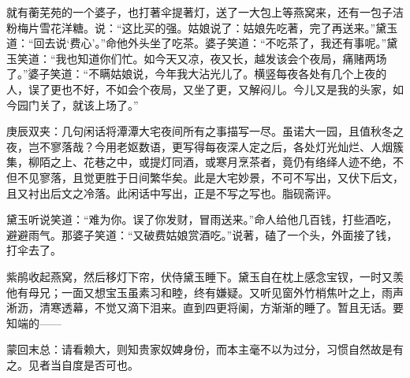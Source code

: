 \begin{parag}
    就有蘅芜苑的一个婆子，也打著伞提著灯，送了一大包上等燕窝来，还有一包子洁粉梅片雪花洋糖。说：“这比买的强。姑娘说了：姑娘先吃著，完了再送来。”黛玉道：“回去说‘费心’。”命他外头坐了吃茶。婆子笑道：“不吃茶了，我还有事呢。”黛玉笑道：“我也知道你们忙。如今天又凉，夜又长，越发该会个夜局，痛赌两场了。”婆子笑道：“不瞒姑娘说，今年我大沾光儿了。横竖每夜各处有几个上夜的人，误了更也不好，不如会个夜局，又坐了更，又解闷儿。今儿又是我的头家，如今园门关了，就该上场了。”\begin{note}庚辰双夹：几句闲话将潭潭大宅夜间所有之事描写一尽。虽诺大一园，且值秋冬之夜，岂不寥落哉？今用老妪数语，更写得每夜深人定之后，各处灯光灿烂、人烟簇集，柳陌之上、花巷之中，或提灯同酒，或寒月烹茶者，竟仍有络绎人迹不绝，不但不见寥落，且觉更胜于日间繁华矣。此是大宅妙景，不可不写出，又伏下后文，且又衬出后文之冷落。此闲话中写出，正是不写之写也。脂砚斋评。\end{note}黛玉听说笑道：“难为你。误了你发财，冒雨送来。”命人给他几百钱，打些酒吃，避避雨气。那婆子笑道：“又破费姑娘赏酒吃。”说著，磕了一个头，外面接了钱，打伞去了。
\end{parag}


\begin{parag}
    紫鹃收起燕窝，然后移灯下帘，伏侍黛玉睡下。黛玉自在枕上感念宝钗，一时又羡他有母兄；一面又想宝玉虽素习和睦，终有嫌疑。又听见窗外竹梢焦叶之上，雨声淅沥，清寒透幕，不觉又滴下泪来。直到四更将阑，方渐渐的睡了。暂且无话。要知端的——
\end{parag}


\begin{parag}
    \begin{note}蒙回末总：请看赖大，则知贵家奴婢身份，而本主毫不以为过分，习惯自然故是有之。见者当自度是否可也。\end{note}
\end{parag}

